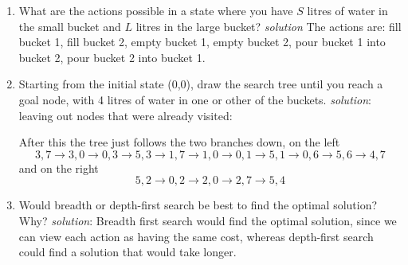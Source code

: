 \documentclass[a4paper,12pt]{article}
\begin{document}
\begin{enumerate}
    \item What are the actions possible in a state where you have $S$ litres of water in the small bucket and $L$ litres in the large bucket? \textsl{solution} The actions are: fill bucket 1, fill bucket 2, empty bucket 1, empty bucket 2, pour bucket 1 into bucket 2, pour bucket 2 into bucket 1.
    \item Starting from the initial state (0,0), draw the search tree until you reach a goal node, with 4 litres of water in one or other of the buckets. \textsl{solution}: leaving out nodes that were already visited:

\begin{center}

\end{center}
After this the tree just follows the two branches down, on the left
$$3,7\rightarrow 3,0 \rightarrow 0,3 \rightarrow 5,3 \rightarrow 1,7 \rightarrow 1,0 \rightarrow 0,1 \rightarrow 5,1 \rightarrow 0,6 \rightarrow 5,6 \rightarrow 4,7$$
and on the right
$$5,2\rightarrow 0,2\rightarrow 2,0 \rightarrow 2,7 \rightarrow 5,4$$

    \item Would breadth or depth-first search be best to find the optimal solution? Why? \textsl{solution}: Breadth first search would find the optimal solution, since we can view each action as
having the same cost, whereas depth-first search could find a solution that would take
longer.
\end{enumerate}
\end{document}
